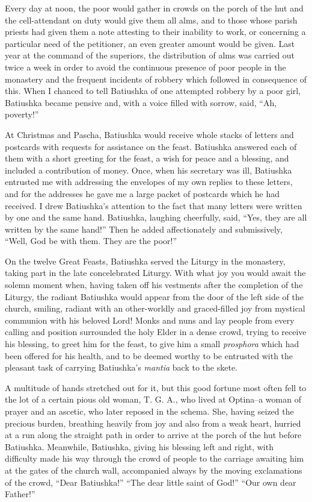 Every day at noon, the poor would gather in crowds on the porch of the hut and the cell-attendant on duty would give them all alms, and to those whose parish priests had given them a note attesting to their inability to work, or concerning a particular need of the petitioner, an even greater amount would be given. Last year at the command of the superiors, the distribution of alms was carried out twice a week in order to avoid the continuous presence of poor people in the monastery and the frequent incidents of robbery which followed in consequence of this. When I chanced to tell Batiushka of one attempted robbery by a poor girl, Batiushka became pensive and, with a voice filled with sorrow, said, “Ah, poverty!”

At Christmas and Pascha, Batiushka would receive whole stacks of letters and postcards with requests for assistance on the feast. Batiushka answered each of them with a short greeting for the feast, a wish for peace and a blessing, and included a contribution of money. Once, when his secretary was ill, Batiushka entrusted me with addressing the envelopes of my own replies to these letters, and for the addresses he gave me a large packet of postcards which he had received. I drew Batiushka's attention to the fact that many letters were written by one and the same hand. Batiushka, laughing cheerfully, said, “Yes, they are all written by the same hand!” Then he added affectionately and submissively, “Well, God be with them. They are the poor!”

On the twelve Great Feasts, Batiushka served the Liturgy in the monastery, taking part in the late concelebrated Liturgy. With what joy you would await the solemn moment when, having taken off his vestments after the completion of the Liturgy, the radiant Batiushka would appear from the door of the left side of the church, smiling, radiant with an other-worldly and graced-filled joy from mystical communion with his beloved Lord! Monks and nuns and lay people from every calling and position surrounded the holy Elder in a dense crowd, trying to receive his blessing, to greet him for the feast, to give him a small \textit{prosphora} which had been offered for his health, and to be deemed worthy to be entrusted with the pleasant task of carrying Batiushka's \textit{mantia} back to the skete.

A multitude of hands stretched out for it, but this good fortune most often fell to the lot of a certain pious old woman, T. G. A., who lived at Optina--a woman of prayer and an ascetic, who later reposed in the schema. She, having seized the precious burden, breathing heavily from joy and also from a weak heart, hurried at a run along the straight path in order to arrive at the porch of the hut before Batiushka. Meanwhile, Batiushka, giving his blessing left and right, with difficulty made his way through the crowd of people to the carriage awaiting him at the gates of the church wall, accompanied always by the moving exclamations of the crowd, “Dear Batiushka!” “The dear little saint of God!” “Our own dear Father!”

